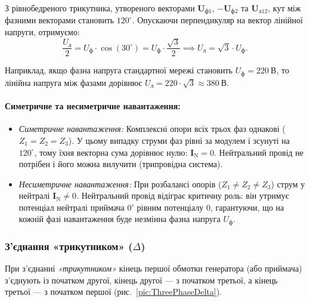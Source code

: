 \documentclass[]{ConspectBook}
\begin{document}
З рівнобедреного трикутника, утвореного векторами $\mathbf{U}_{\text{ф}1}$, $-\mathbf{U}_{\text{ф}2}$ та $\mathbf{U}_{\text{л}12}$, кут між фазними векторами становить $120^\circ$. Опускаючи перпендикуляр на вектор лінійної напруги, отримуємо:
\begin{equation}
	\frac{U_\text{л}}{2} = U_\text{ф} \cdot \cos(30^\circ) = U_\text{ф} \cdot \frac{\sqrt{3}}{2} \implies U_\text{л} = \sqrt{3} \cdot U_\text{ф}.
\end{equation}

Наприклад, якщо фазна напруга стандартної мережі становить $U_\text{ф} = 220~\text{В}$, то лінійна напруга між фазами дорівнює $U_\text{л} = 220 \cdot \sqrt{3} \approx 380~\text{В}$.

\paragraph{Симетричне та несиметричне навантаження:}
\begin{itemize}
    \item \emph{Симетричне навантаження:} Комплексні опори всіх трьох фаз однакові ($Z_1 = Z_2 = Z_3$). У цьому випадку струми фаз рівні за модулем і зсунуті на $120^\circ$, тому їхня векторна сума дорівнює нулю: $\mathbf{I}_\text{N} = 0$. Нейтральний провід не потрібен і його можна вилучити (трипровідна система).
    \item \emph{Несиметричне навантаження:} При розбалансі опорів ($Z_1 \neq Z_2 \neq Z_3$) струм у нейтралі $\mathbf{I}_\text{N} \neq 0$. Нейтральний провід відіграє критичну роль: він утримує потенціал нейтралі приймача $0'$ рівним потенціалу $0$, гарантуючи, що на кожній фазі навантаження буде незмінна фазна напруга $U_\text{ф}$.
\end{itemize}

\subsubsection{З'єднання «трикутником» ($\Delta$)}

При з'єднанні \emph{«трикутником»} кінець першої обмотки генератора (або приймача) з'єднують із початком другої, кінець другої --- з початком третьої, а кінець третьої --- з початком першої (рис.~\ref{pic:ThreePhaseDelta}).
\end{document}
